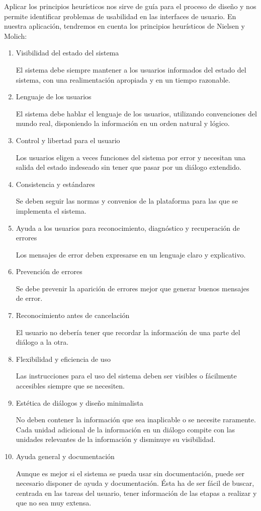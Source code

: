 Aplicar los principios heurísticos nos sirve de guía para el proceso de diseño y nos permite identificar problemas de usabilidad en las interfaces de usuario. En nuestra aplicación, tendremos en cuenta los principios heurísticos de Nielsen y Molich:


\begin{enumerate}
\item Visibilidad del estado del sistema


El sistema debe siempre mantener a los usuarios informados del estado del sistema, con una realimentación apropiada y en un tiempo razonable.
\item Lenguaje de los usuarios


El sistema debe hablar el lenguaje de los usuarios, utilizando convenciones del mundo real, disponiendo la información en un orden natural y lógico.
\item Control y libertad para el usuario


Los usuarios eligen a veces funciones del sistema por error y necesitan una salida del estado indeseado sin tener que pasar por un diálogo extendido.
\item Consistencia y estándares


Se deben seguir las normas y convenios de la plataforma para las que se implementa el sistema.
\item Ayuda a los usuarios para reconocimiento, diagnóstico y recuperación de errores


Los mensajes de error deben expresarse en un lenguaje claro y explicativo.
\item Prevención de errores


Se debe prevenir la aparición de errores mejor que generar buenos mensajes de error.
\item Reconocimiento antes de cancelación


El usuario no debería tener que recordar la información de una parte del diálogo a la otra.
\item Flexibilidad y eficiencia de uso


Las instrucciones para el uso del sistema deben ser visibles o fácilmente accesibles siempre que se necesiten.
\item Estética de diálogos y diseño minimalista


No deben contener la información que sea inaplicable o se necesite raramente. Cada unidad adicional de la información en un diálogo compite con las unidades relevantes de la información y disminuye su visibilidad.
\item Ayuda general y documentación


Aunque es mejor si el sistema se pueda usar sin documentación, puede ser necesario disponer de ayuda y documentación. Ésta ha de ser fácil de buscar, centrada en las tareas del usuario, tener información de las etapas a realizar y que no sea muy extensa. \cite{eval_heuris}
\end{enumerate}


